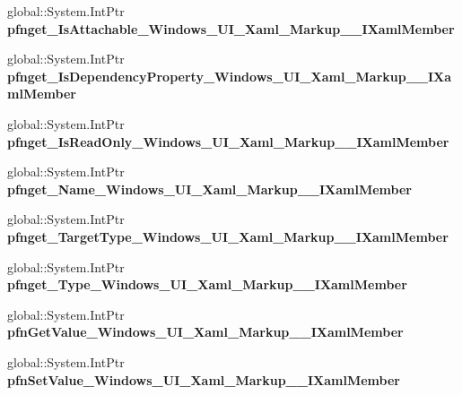 \begin{DoxyCompactItemize}
global\+::\+System.\+Int\+Ptr {\bfseries pfnget\+\_\+\+Is\+Attachable\+\_\+\+Windows\+\_\+\+U\+I\+\_\+\+Xaml\+\_\+\+Markup\+\_\+\+\_\+\+I\+Xaml\+Member}
\item 
\mbox{\label{struct_windows_1_1_u_i_1_1_xaml_1_1_markup_1_1_i_xaml_member_____impl_1_1_vtbl_a0ae390efb36ec7ae9a2d1ba77a4194f8}} 
global\+::\+System.\+Int\+Ptr {\bfseries pfnget\+\_\+\+Is\+Dependency\+Property\+\_\+\+Windows\+\_\+\+U\+I\+\_\+\+Xaml\+\_\+\+Markup\+\_\+\+\_\+\+I\+Xaml\+Member}
\item 
\mbox{\label{struct_windows_1_1_u_i_1_1_xaml_1_1_markup_1_1_i_xaml_member_____impl_1_1_vtbl_afc8070184251673a65506dab984e5479}} 
global\+::\+System.\+Int\+Ptr {\bfseries pfnget\+\_\+\+Is\+Read\+Only\+\_\+\+Windows\+\_\+\+U\+I\+\_\+\+Xaml\+\_\+\+Markup\+\_\+\+\_\+\+I\+Xaml\+Member}
\item 
\mbox{\label{struct_windows_1_1_u_i_1_1_xaml_1_1_markup_1_1_i_xaml_member_____impl_1_1_vtbl_ac22a27beba659ea958bebaeb62245899}} 
global\+::\+System.\+Int\+Ptr {\bfseries pfnget\+\_\+\+Name\+\_\+\+Windows\+\_\+\+U\+I\+\_\+\+Xaml\+\_\+\+Markup\+\_\+\+\_\+\+I\+Xaml\+Member}
\item 
\mbox{\label{struct_windows_1_1_u_i_1_1_xaml_1_1_markup_1_1_i_xaml_member_____impl_1_1_vtbl_a41b245efa3449839968217a7cb75cadd}} 
global\+::\+System.\+Int\+Ptr {\bfseries pfnget\+\_\+\+Target\+Type\+\_\+\+Windows\+\_\+\+U\+I\+\_\+\+Xaml\+\_\+\+Markup\+\_\+\+\_\+\+I\+Xaml\+Member}
\item 
\mbox{\label{struct_windows_1_1_u_i_1_1_xaml_1_1_markup_1_1_i_xaml_member_____impl_1_1_vtbl_ac49b95ab35da7f49c7c210efb9949fc1}} 
global\+::\+System.\+Int\+Ptr {\bfseries pfnget\+\_\+\+Type\+\_\+\+Windows\+\_\+\+U\+I\+\_\+\+Xaml\+\_\+\+Markup\+\_\+\+\_\+\+I\+Xaml\+Member}
\item 
\mbox{\label{struct_windows_1_1_u_i_1_1_xaml_1_1_markup_1_1_i_xaml_member_____impl_1_1_vtbl_ac0d91e36523583cc8cb750fcbe754a10}} 
global\+::\+System.\+Int\+Ptr {\bfseries pfn\+Get\+Value\+\_\+\+Windows\+\_\+\+U\+I\+\_\+\+Xaml\+\_\+\+Markup\+\_\+\+\_\+\+I\+Xaml\+Member}
\item 
\mbox{\label{struct_windows_1_1_u_i_1_1_xaml_1_1_markup_1_1_i_xaml_member_____impl_1_1_vtbl_aa5306dfd05ec2997bf81fe744df9813a}} 
global\+::\+System.\+Int\+Ptr {\bfseries pfn\+Set\+Value\+\_\+\+Windows\+\_\+\+U\+I\+\_\+\+Xaml\+\_\+\+Markup\+\_\+\+\_\+\+I\+Xaml\+Member}
\end{DoxyCompactItemize}
